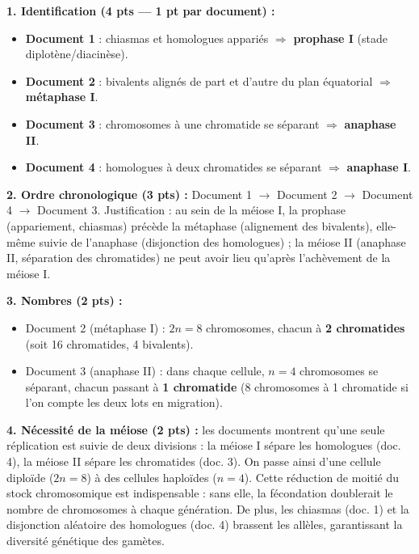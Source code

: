 \documentclass[11pt]{article}
\begin{document}
\begin{corrige}
\textbf{1. Identification (4 pts — 1 pt par document) :}
\begin{itemize}
\item \textbf{Document 1} : chiasmas et homologues appariés $\Rightarrow$ \textbf{prophase I} (stade diplotène/diacinèse).
\item \textbf{Document 2} : bivalents alignés de part et d'autre du plan équatorial $\Rightarrow$ \textbf{métaphase I}.
\item \textbf{Document 3} : chromosomes à une chromatide se séparant $\Rightarrow$ \textbf{anaphase II}.
\item \textbf{Document 4} : homologues à deux chromatides se séparant $\Rightarrow$ \textbf{anaphase I}.
\end{itemize}

\textbf{2. Ordre chronologique (3 pts) :} Document 1 $\rightarrow$ Document 2 $\rightarrow$ Document 4 $\rightarrow$ Document 3. Justification : au sein de la méiose I, la prophase (appariement, chiasmas) précède la métaphase (alignement des bivalents), elle-même suivie de l'anaphase (disjonction des homologues) ; la méiose II (anaphase II, séparation des chromatides) ne peut avoir lieu qu'après l'achèvement de la méiose I.

\textbf{3. Nombres (2 pts) :}
\begin{itemize}
\item Document 2 (métaphase I) : $2n = 8$ chromosomes, chacun à \textbf{2 chromatides} (soit 16 chromatides, 4 bivalents).
\item Document 3 (anaphase II) : dans chaque cellule, $n = 4$ chromosomes se séparant, chacun passant à \textbf{1 chromatide} (8 chromosomes à 1 chromatide si l'on compte les deux lots en migration).
\end{itemize}

\textbf{4. Nécessité de la méiose (2 pts) :} les documents montrent qu'une seule réplication est suivie de deux divisions : la méiose I sépare les homologues (doc. 4), la méiose II sépare les chromatides (doc. 3). On passe ainsi d'une cellule diploïde ($2n = 8$) à des cellules haploïdes ($n = 4$). Cette réduction de moitié du stock chromosomique est indispensable : sans elle, la fécondation doublerait le nombre de chromosomes à chaque génération. De plus, les chiasmas (doc. 1) et la disjonction aléatoire des homologues (doc. 4) brassent les allèles, garantissant la diversité génétique des gamètes.


\end{corrige}
\end{document}
